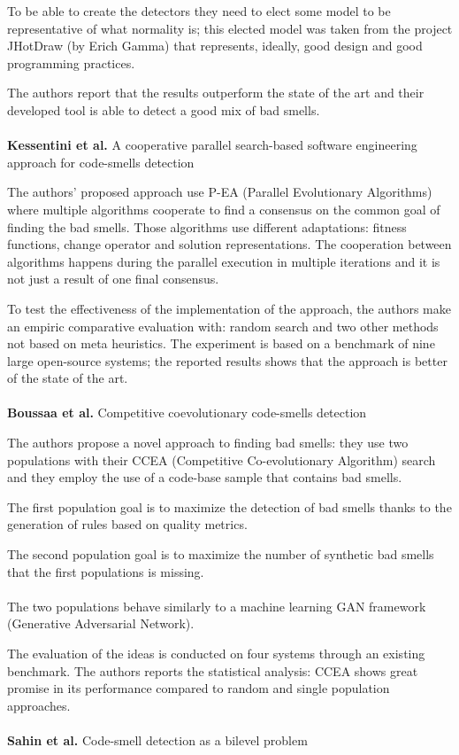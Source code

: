 To be able to create the detectors they need to elect some model to be representative of what normality is; this elected model was taken from the project JHotDraw (by Erich Gamma) that represents, ideally, good design and good programming practices.

The authors report that the results outperform the state of the art and their developed tool is able to detect a good mix of bad smells.
\\
\\
\textbf{Kessentini et al.} \cite{kessentini2014cooperative} A cooperative parallel search-based software engineering approach for code-smells detection

The authors' proposed approach use P-EA (Parallel Evolutionary Algorithms) where multiple algorithms cooperate to find a consensus on the common goal of finding the bad smells. Those algorithms use different adaptations: fitness functions, change operator and solution representations. The cooperation between algorithms happens during the parallel execution in multiple iterations and it is not just a result of one final consensus.

To test the effectiveness of the implementation of the approach, the authors make an empiric comparative evaluation with: random search and two other methods not based on meta heuristics.
The experiment is based on a benchmark of nine large open-source systems; the reported results shows that the approach is better of the state of the art.
\\
\\
\textbf{Boussaa et al.} \cite{boussaa2013competitive} Competitive coevolutionary code-smells detection

The authors propose a novel approach to finding bad smells: they use two populations with their CCEA (Competitive Co-evolutionary Algorithm) search and they employ the use of a code-base sample that contains bad smells. 

The first population goal is to maximize the detection of bad smells thanks to the generation of rules based on quality metrics. 

The second population goal is to maximize the number of synthetic bad smells that the first populations is missing.
\\
\\
The two populations behave similarly to a machine learning GAN framework (Generative Adversarial Network).

The evaluation of the ideas is conducted on four systems through an existing benchmark. The authors reports the statistical analysis: CCEA shows great promise in its performance compared to random and single population approaches.
\\
\\
\textbf{Sahin et al.} \cite{sahin2014code} Code-smell detection as a bilevel problem

